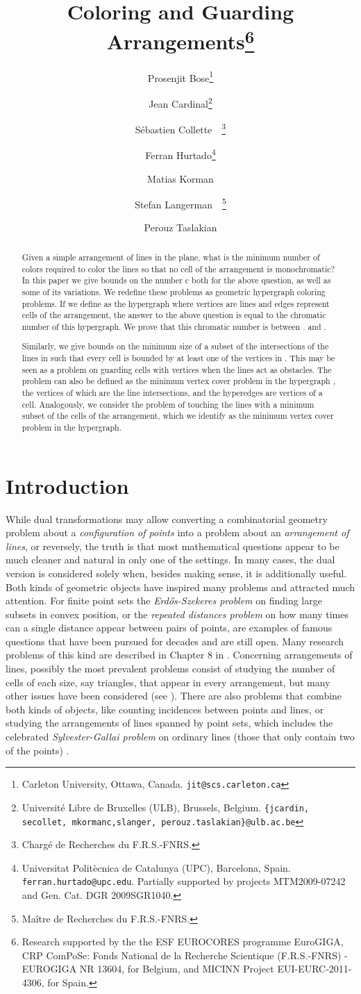 \documentclass[11pt,a4paper]{article}
\title{Coloring and Guarding Arrangements\thanks{Research supported by the the ESF EUROCORES programme EuroGIGA, CRP ComPoSe: Fonds National de la Recherche Scientique (F.R.S.-FNRS) - EUROGIGA NR 13604, for Belgium, and MICINN Project EUI-EURC-2011-4306, for Spain.}}
\author{Prosenjit Bose\thanks{Carleton University, Ottawa, Canada. \tt{jit@scs.carleton.ca}}
\and Jean Cardinal\thanks{Universit\'e Libre de Bruxelles (ULB), Brussels, Belgium. \tt{\{jcardin, secollet, mkormanc,slanger, perouz.taslakian\}@ulb.ac.be}} 
\and S\'ebastien Collette\footnotemark[3]~~\thanks{Charg\'e de Recherches du F.R.S.-FNRS.}  
\and Ferran Hurtado\thanks{Universitat Polit\`{e}cnica de Catalunya (UPC), Barcelona, Spain.
 {\tt ferran.hurtado@upc.edu}. Partially supported by projects MTM2009-07242 and Gen. Cat. DGR 2009SGR1040.} 
  \and Matias Korman\footnotemark[3]
  \and Stefan Langerman\footnotemark[3]~~\thanks{Ma\^itre de Recherches du F.R.S.-FNRS.} 
  \and Perouz Taslakian\footnotemark[3]}
\newcommand{\sholong}[2]{#2}
\begin{document}
\maketitle

\begin{abstract}
Given a simple arrangement of lines in the plane, what is the minimum number  of colors required to color the lines so that no cell of the arrangement is monochromatic? In this paper we give bounds on the number c both for the above question, as well as some of its variations. We redefine these problems as geometric hypergraph coloring problems. If we define  as the hypergraph where vertices are lines and edges represent cells of the arrangement, the answer to the above question is equal to the chromatic number of this hypergraph. We prove that this chromatic number is between . and .

Similarly, we give bounds on the minimum size of a subset  of the intersections of the lines in  such that every cell is bounded by at least one of the vertices in . This may be seen as a problem on guarding cells with vertices when the lines act as obstacles. The problem can also be defined as the minimum vertex cover problem in the hypergraph , the vertices of which are the line intersections, and the hyperedges are vertices of a cell. Analogously, we consider the problem of touching the lines with a minimum subset of the cells of the arrangement, which we identify as the minimum vertex cover problem in the  hypergraph.



\end{abstract}
\sholong{\newpage}{}

\section{Introduction}
While dual transformations may allow converting a combinatorial geometry problem about a \emph{configuration of points} into a problem about an \emph{arrangement of lines}, or reversely, the truth is that most mathematical questions appear to be much cleaner and natural in only one of the settings. In many cases, the dual version is considered solely when, besides making sense, it is additionally useful. Both kinds of geometric objects have inspired many problems and attracted much attention. For finite point sets the \emph{Erd\H{o}s-Szekeres problem} on finding large subsets in convex position, or the \emph{repeated distances problem} on how many times can a single distance appear between pairs of points, are examples of famous questions that have been pursued for decades and are still open. Many research problems of this kind are described in Chapter 8 in \cite{BMP}. Concerning arrangements of lines, possibly the most prevalent problems consist of studying the number of cells of each size, say triangles, that appear in every arrangement, but many other issues have been considered (see \cite{Fe,Gru1,Gru2}). There are also problems that combine both kinds of objects, like counting incidences between points and lines, or studying the arrangements of lines spanned by point sets, which includes the celebrated \emph{Sylvester-Gallai problem} on ordinary lines (those that only contain two of the points) \cite{BMP}.
\end{document}
